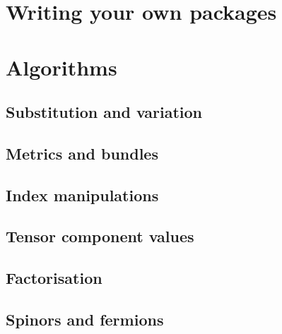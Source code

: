 \documentclass[11pt]{book}
\begin{document}
\chapter{Writing your own packages}



\chapter{Algorithms}

\section{Substitution and variation}









\section{Metrics and bundles}









\section{Index manipulations}











\section{Tensor component values}




\section{Factorisation}




\section{Spinors and fermions}
\end{document}
